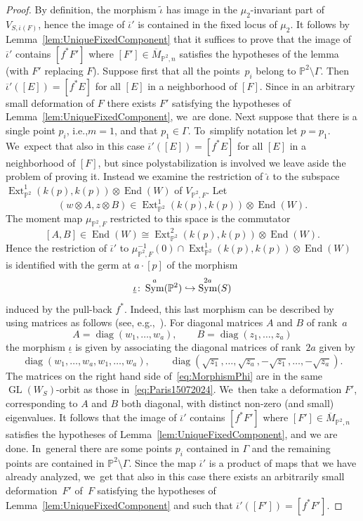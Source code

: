 \documentclass[11pt]{article}
\newcommand{\ie}{i.e.,\xspace}
\newcommand\hto{\mathrel{\lhook\joinrel\to}}
\newcommand{\PP}{{\mathbb P}}\let\P\PP
\DeclareMathOperator{\diag}{diag}
\DeclareMathOperator{\End}{End}
\DeclareMathOperator{\Ext}{Ext}
\DeclareMathOperator{\GL}{GL}
\DeclareMathOperator{\Sym}{Sym}
\let\ov\overline
\let\wh\widehat
\theoremstyle{definition}
\begin{document}
\begin{proof}
By definition, the morphism $\widetilde{\iota}$ has image in the $\mu_2$-invariant part of $V_{S,\overline{\iota}(F)}$, hence the image of $\overline{\iota}'$ is contained in the fixed locus of $\mu_2$. It follows by Lemma~\ref{lem:UniqueFixedComponent} that it suffices to prove that the image of $\overline{\iota}'$ contains $[f^{*}F']$ where $[F']\in\overline{M}_{\PP^2,n}$ satisfies the hypotheses of the lemma (with $F'$ replacing $F$).
Suppose first that all the points~$p_i$ belong to $\PP^2\setminus\Gamma$. Then
$\ov{\iota}'([E])=[f^{*}E]$ for all $[E]$ in a neighborhood of $[F]$. Since in an arbitrary small deformation of $F$ there exists $F'$ satisfying the hypotheses of Lemma~\ref{lem:UniqueFixedComponent}, we~are done. Next suppose that there is a single point $p_i$, \ie $m=1$, and that $p_1\in\Gamma$. To~simplify notation let $p=p_1$. We~expect that also in this case
$\ov{\iota}'([E])=[f^{*}E]$ for all $[E]$ in a neighborhood of $[F]$, but since polystabilization is involved we leave aside the problem of proving it. Instead we examine the restriction of $\wh{\iota}$ to the subspace
$\Ext^1_{\PP^2}(k(p),k(p))\otimes \End(W)$ of $V_{\PP^2,F}$.
Let
\[
(w\otimes A,z\otimes B)\in\Ext^1_{\PP^2}(k(p),k(p))\otimes \End(W).
\]
The moment map $\mu_{\PP^2,F}$ restricted to this space is the commutator
\[
\left[A,B\right]\in\End(W)\cong\Ext^2_{\PP^2}(k(p),k(p))\otimes \End(W).
\]
Hence the restriction of $\overline{\iota}'$ to $\mu_{\PP^2,F}^{-1}(0)\cap \Ext^1_{\PP^2}(k(p),k(p))\otimes \End(W)$ is identified with the germ at $a\cdot [p]$ of the morphism
\[
\underline{\iota}\colon \Sym^{a}(\PP^2)\hto\Sym^{2a}(S)
\]
induced by the pull-back $f^*$.
Indeed, this last morphism can be described by using matrices as follows (see, e.g.,~\cite[\S 1.4]{Nakajima:book}).
For diagonal matrices $A$ and $B$ of rank~$a$
\[
A=\diag(w_1,\dots,w_a), \qquad B=\diag(z_1,\dots,z_a)
\]
the morphism $\underline{\iota}$ is given by associating the diagonal matrices of rank~$2a$ given by
\begin{equation}\label{eq:Paris15072024}
\diag(w_1,\dots,w_a,w_1,\dots,w_a), \qquad \diag(\sqrt{z_1},\dots,\sqrt{z_a},-\sqrt{z_1},\dots,-\sqrt{z_a}).
\end{equation}
The matrices on the right hand side of~\eqref{eq:MorphismPhi} are in the same $\GL(W_S)$-orbit as those in~\eqref{eq:Paris15072024}. We~then take a deformation $F'$, corresponding to $A$ and $B$ both diagonal, with distinct non-zero (and small) eigenvalues. It follows that the image of $\ov{\iota}'$ contains $[f^{*}F']$ where $[F']\in\overline{M}_{\PP^2,n}$ satisfies the hypotheses of
Lemma~\ref{lem:UniqueFixedComponent}, and we are done. In~general there are some points $p_i$ contained in $\Gamma$ and the remaining points are contained in $\PP^2\setminus\Gamma$. Since the map $\ov{\iota}'$ is a product of maps that we have already analyzed, we~get that also in this case there exists an arbitrarily small deformation~$F'$ of~$F$ satisfying the hypotheses of Lemma~\ref{lem:UniqueFixedComponent} and such that $\ov{\iota}'([F'])=[f^{*}F']$.
\end{proof}
\end{document}
